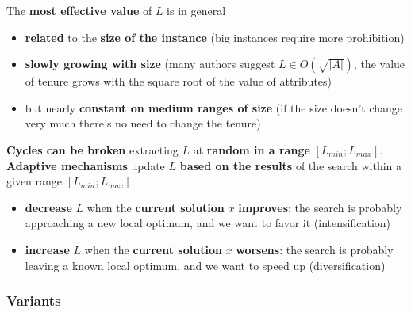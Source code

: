 \documentclass[11pt]{article}
\begin{document}
	The \textbf{most effective value} of $L$ is in general
	\begin{itemize}
		\item \textbf{related} to the \textbf{size of the instance} (big instances require more prohibition)
		
		\item \textbf{slowly growing with size} (many authors suggest $L \in O(\sqrt{|A|})$, the value of tenure grows with the square root of the value of attributes)
		
		\item but nearly \textbf{constant on medium ranges of size} (if the size doesn't change very much there's no need to change the tenure)
	\end{itemize}
	
	\textbf{Cycles can be broken} extracting $L$ at \textbf{random in a range} $[L_{min}; L_{max}]$.\\
	
	\nn
	\textbf{Adaptive mechanisms} update $L$ \textbf{based on the results} of the search within a given range $[L_{min}; L_{max}]$
	\begin{itemize}
		\item \textbf{decrease} $L$ when the \textbf{current solution} $x$ \textbf{improves}: the search is probably approaching a new local optimum, and we want to favor it (intensification)
		
		\item \textbf{increase} $L$ when the \textbf{current solution} $x$ \textbf{worsens}: the search is probably leaving a known local optimum, and we want to speed up (diversification)
	\end{itemize}
	
	\newpage
	
	\subsubsection{Variants}
	
\end{document}
